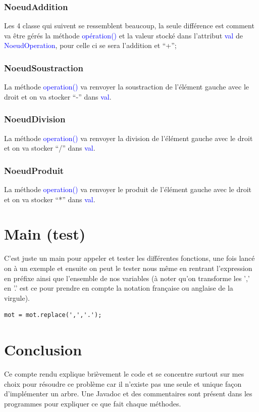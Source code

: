 \documentclass[a4paper]{article}
\renewcommand{\texttt}[2][blue]{\textcolor{#1}{\ttfamily #2}}
\begin{document}
\subsubsection{NoeudAddition}
\label{subsubsec:noeud_add}

Les 4 classe qui suivent se ressemblent beaucoup, la seule différence est comment va être gérés la méthode \texttt{opération()} et la valeur stocké dans l'attribut \texttt{val} de \texttt{NoeudOperation}, pour celle ci se sera l'addition et ``+'';

\subsubsection{NoeudSoustraction}
\label{subsubsec:noeud_sub}

La méthode \texttt{operation()} va renvoyer la soustraction de l'élément gauche avec le droit et on va stocker ``-'' dans \texttt{val}. 

\subsubsection{NoeudDivision}
\label{subsubsec:noeud_div}

La méthode \texttt{operation()} va renvoyer la division de l'élément gauche avec le droit et on va stocker ``/''  dans \texttt{val}. 

\subsubsection{NoeudProduit}
\label{subsubsec:noeud_prod}

La méthode \texttt{operation()} va renvoyer le produit de l'élément gauche avec le droit et on va stocker ``*'' dans \texttt{val}. 


\section{Main (test)}
\label{test}

C'est juste un main pour appeler et tester les différentes fonctions, une fois lancé on à un exemple et ensuite on peut le tester nous même en rentrant l'expression en préfixe ainsi que l'ensemble de nos variables (à noter qu'on transforme les ',' en '.' est ce pour prendre en compte la notation française ou anglaise de la virgule).

\begin{lstlisting}
mot = mot.replace(',','.');
\end{lstlisting}

\section{Conclusion}

Ce compte rendu explique brièvement le code et se concentre surtout sur mes choix pour résoudre ce problème car il n'existe pas une seule et unique façon d'implémenter un arbre. Une Javadoc et des commentaires sont présent dans les programmes pour expliquer ce que fait chaque méthodes.
\end{document}
